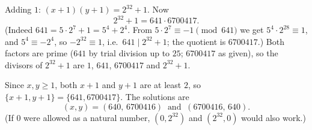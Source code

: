 Adding $1$: $(x+1)(y+1)=2^{32}+1$. Now
\[
2^{32}+1=641\cdot6700417 .
\]
(Indeed $641=5\cdot2^7+1=5^4+2^4$. From $5\cdot2^7\equiv-1\pmod{641}$ we get $5^4\cdot2^{28}\equiv1$, and $5^4\equiv-2^4$, so $-2^{32}\equiv1$, i.e.\ $641\mid2^{32}+1$; the quotient is $6700417$.) Both factors are prime ($641$ by trial division up to $25$; $6700417$ as given), so the divisors of $2^{32}+1$ are $1$, $641$, $6700417$ and $2^{32}+1$.

Since $x,y\ge1$, both $x+1$ and $y+1$ are at least $2$, so $\{x+1,y+1\}=\{641,6700417\}$. The solutions are
\[
\boxed{(x,y)=(640,\,6700416)\ \text{ and }\ (6700416,\,640)}.
\]
(If $0$ were allowed as a natural number, $(0,2^{32})$ and $(2^{32},0)$ would also work.)
